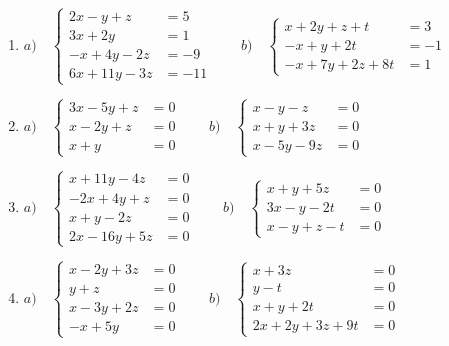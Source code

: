 \begin{enumerate}
\rightline{\textcolor{gris}{Solución: $a) \quad (2, 1+\lambda, -1, \lambda); \; SCI \qquad b) \quad (-1,4,1)$  }}

\item $a) \quad \begin{cases} 2x-y+z &= 5 \\ 3x+2y &= 1 \\ -x+4y-2z &= -9 \\ 6x+11y-3z &= -11  \end{cases} \qquad b) \quad \begin{cases} x+2y+z+t&=3\\-x+y+2t&=-1\\-x+7y+2z+8t&=1 \end{cases}$


\item $a) \quad \begin{cases} 3x-5y+z&=0\\x-2y+z&=0\\x+y&=0 \end{cases} \qquad b) \quad \begin{cases} x-y-z&=0\\x+y+3z&=0\\x-5y-9z&=0 \end{cases}$

\rightline{\textcolor{gris}{Solución: $a) \quad (0,0,0)\; SCD \qquad b) \quad (-\lambda, -2\lambda, \lambda); \; SCI$  }}

\item $a) \quad \begin{cases} x+11y-4z&=0\\-2x+4y+z&=0\\ x+y-2z&=0\\2x-16y+5z&=0 \end{cases} \qquad b) \quad \begin{cases}   x+y+5z&=0\\3x-y-2t&=0\\x-y+z-t&=0\end{cases}$

\rightline{\textcolor{gris}{Solución: $a) \quad (0,0,0)\; SCD \qquad b) \quad (\lambda, -\lambda, 0, 2\lambda)\; \; SCI$  }}

\item $a) \quad \begin{cases} x-2y+3z&=0\\y+z&=0\\x-3y+2z&=0\\-x+5y&=0 \end{cases} \qquad b) \quad \begin{cases} x+3z&=0\\y-t&=0\\x+y+2t&=0\\2x+2y+3z+9t&=0 \end{cases}$


\end{enumerate}
